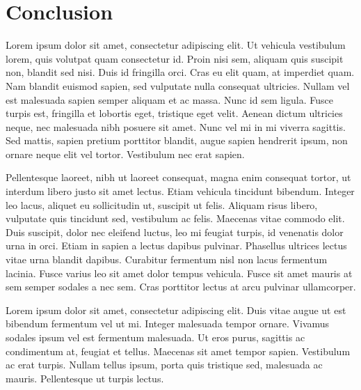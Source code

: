 \documentclass[12pt,compsoc]{IEEEtran}
\begin{document}
\section{Conclusion}
Lorem ipsum dolor sit amet, consectetur adipiscing elit. Ut vehicula vestibulum lorem, quis volutpat quam consectetur id. Proin nisi sem, aliquam quis suscipit non, blandit sed nisi. Duis id fringilla orci. Cras eu elit quam, at imperdiet quam. Nam blandit euismod sapien, sed vulputate nulla consequat ultricies. Nullam vel est malesuada sapien semper aliquam et ac massa. Nunc id sem ligula. Fusce turpis est, fringilla et lobortis eget, tristique eget velit. Aenean dictum ultricies neque, nec malesuada nibh posuere sit amet. Nunc vel mi in mi viverra sagittis. Sed mattis, sapien pretium porttitor blandit, augue sapien hendrerit ipsum, non ornare neque elit vel tortor. Vestibulum nec erat sapien.

Pellentesque laoreet, nibh ut laoreet consequat, magna enim consequat tortor, ut interdum libero justo sit amet lectus. Etiam vehicula tincidunt bibendum. Integer leo lacus, aliquet eu sollicitudin ut, suscipit ut felis. Aliquam risus libero, vulputate quis tincidunt sed, vestibulum ac felis. Maecenas vitae commodo elit. Duis suscipit, dolor nec eleifend luctus, leo mi feugiat turpis, id venenatis dolor urna in orci. Etiam in sapien a lectus dapibus pulvinar. Phasellus ultrices lectus vitae urna blandit dapibus. Curabitur fermentum nisl non lacus fermentum lacinia. Fusce varius leo sit amet dolor tempus vehicula. Fusce sit amet mauris at sem semper sodales a nec sem. Cras porttitor lectus at arcu pulvinar ullamcorper.

Lorem ipsum dolor sit amet, consectetur adipiscing elit. Duis vitae augue ut est bibendum fermentum vel ut mi. Integer malesuada tempor ornare. Vivamus sodales ipsum vel est fermentum malesuada. Ut eros purus, sagittis ac condimentum at, feugiat et tellus. Maecenas sit amet tempor sapien. Vestibulum ac erat turpis. Nullam tellus ipsum, porta quis tristique sed, malesuada ac mauris. Pellentesque ut turpis lectus.




\end{document}
